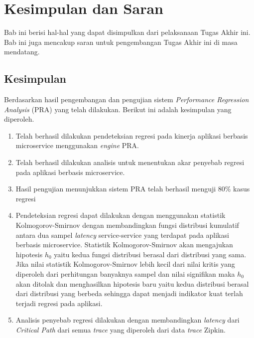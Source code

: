 \chapter{Kesimpulan dan Saran}
Bab ini berisi hal-hal yang dapat disimpulkan dari pelaksanaan Tugas Akhir ini. Bab ini juga mencakup saran untuk pengembangan Tugas Akhir ini di masa mendatang.

\section{Kesimpulan}
Berdasarkan hasil pengembangan dan pengujian sistem \textit{Performance Regression Analysis} (PRA) yang telah dilakukan. Berikut ini adalah kesimpulan yang diperoleh.
\begin{enumerate}
	\item Telah berhasil dilakukan pendeteksian regresi pada kinerja aplikasi berbasis microservice menggunakan \textit{engine} PRA.
	\item Telah berhasil dilakukan analisis untuk menentukan akar penyebab regresi pada aplikasi berbasis microservice.
	\item Hasil pengujian menunjukkan sistem PRA telah berhasil menguji 80\% kasus regresi
	\item Pendeteksian regresi dapat dilakukan dengan menggunakan statistik Kolmogorov-Smirnov dengan membandingkan fungsi distribusi kumulatif antara dua sampel \textit{latency} service-service yang terdapat pada aplikasi berbasis microservice. Statistik Kolmogorov-Smirnov akan mengajukan hipotesis $h_{0}$ yaitu kedua fungsi distribusi berasal dari distribusi yang sama. Jika nilai statistik Kolmogorov-Smirnov lebih kecil dari nilai kritis yang diperoleh dari perhitungan banyaknya sampel dan nilai signifikan maka $h_{0}$ akan ditolak dan menghasilkan hipotesis baru yaitu kedua distribusi berasal dari distribusi yang berbeda sehingga dapat menjadi indikator kuat terlah terjadi regresi pada aplikasi.	
	\item Analisis penyebab regresi dilakukan dengan membandingkan \textit{latency} dari \textit{Critical Path} dari semua \textit{trace} yang diperoleh dari data \textit{trace} Zipkin. 
	

\end{enumerate}
